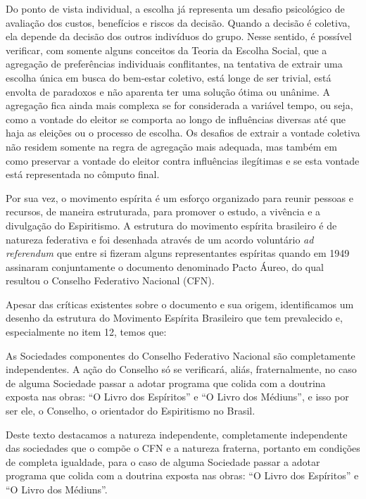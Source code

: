 \begin{citacao}
	Do ponto de vista individual, a escolha já representa um desafio psicológico de avaliação dos custos, benefícios e riscos da decisão. Quando a decisão é coletiva, ela depende da decisão dos outros indivíduos do grupo. Nesse sentido, é possível verificar, com somente alguns conceitos da Teoria da Escolha Social, que a agregação de preferências individuais conflitantes, na tentativa de extrair uma escolha única em busca do bem-estar coletivo, está longe de ser trivial, está envolta de paradoxos e não aparenta ter uma solução ótima ou unânime. A agregação fica ainda mais complexa se for considerada a variável tempo, ou seja, como a vontade do eleitor se comporta ao longo de influências diversas até que haja as eleições ou o processo de escolha. Os desafios de extrair a vontade coletiva não residem somente na regra de agregação mais adequada, mas também em como preservar a vontade do eleitor contra influências ilegítimas e se esta vontade está representada no cômputo final.
\end{citacao}



Por sua vez, o movimento espírita é um esforço organizado para reunir pessoas e recursos, de maneira estruturada, para promover o estudo, a vivência e a divulgação do Espiritismo. A estrutura do movimento espírita brasileiro é de natureza federativa e foi desenhada através de um acordo voluntário \textit{ad referendum} que entre si fizeram alguns representantes espíritas quando em 1949 assinaram conjuntamente o documento denominado Pacto Áureo\cite{pactoaureo2012}, do qual resultou o Conselho Federativo Nacional (CFN). 

Apesar das críticas existentes sobre o documento e sua origem, identificamos um desenho da estrutura do Movimento Espírita Brasileiro que tem prevalecido e, especialmente no item 12, temos que:


\begin{citacao}
As Sociedades componentes do Conselho Federativo Nacional são completamente independentes. A ação do Conselho só se verificará, aliás, fraternalmente, no caso de alguma Sociedade passar a adotar programa que colida com a doutrina exposta nas obras: “O Livro dos Espíritos” e “O Livro dos Médiuns”, e isso por ser ele, o Conselho, o orientador do Espiritismo no Brasil.
\end{citacao}

Deste texto destacamos a natureza independente, completamente independente das sociedades que o compõe o CFN e a natureza fraterna, portanto em condições de completa igualdade, para o caso de alguma Sociedade passar a adotar programa que colida com a doutrina exposta nas obras: “O Livro dos Espíritos” e “O Livro dos Médiuns”.

